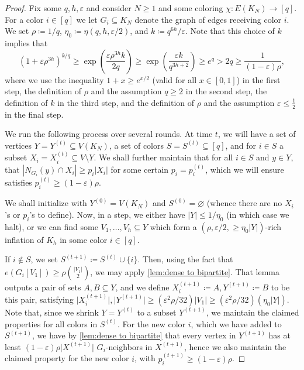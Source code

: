 \documentclass[11pt]{article}
\numberwithin{equation}{section}
\theoremstyle{plain}
\theoremstyle{remark}
\newcommand{\eps}{\ensuremath{\varepsilon}}
\let\emptyset\varnothing
\newcommand\ab[1]{\lvert #1 \rvert}
\newcommand\up[1]{^{(#1)}}
\begin{document}
\begin{proof}


Fix some $q,h,\eps$ and consider $N\ge 1$ and some coloring $\chi:E(K_N)\to [q]$. For a color $i\in [q]$ we let $G_i\subseteq K_N$ denote the graph of edges receiving color $i$. We set $\rho \coloneqq 1/q$, $\eta_0\coloneqq \eta(q,h,\eps/2)$, and $k\coloneqq q^{6h}/\eps$. Note that this choice of $k$ implies that
\begin{equation}\label{eq:k choice}
    (1+\eps \rho^{3h})^{k/q} \geq \exp \left( \frac{\eps \rho^{3h}k}{2q}\right) \geq \exp \left( \frac{\eps k}{q^{3h+2}}\right)\geq e^{q} > 2q \geq \frac{1}{(1-\eps)\rho},
\end{equation}
where we use the inequality $1+x \geq e^{x/2}$ (valid for all $x \in [0,1]$) in the first step, the definition of $\rho$ and the assumption $q \geq 2$ in the second step, the definition of $k$ in the third step, and the definition of $\rho$ and the assumption $\eps \leq \frac 12$ in the final step.

We run the following process over several rounds.
At time $t$, we will have a set of vertices $Y= Y^{(t)} \subseteq V(K_N)$, a set of colors $S= S^{(t)}\subseteq [q]$, and for $i\in S$ a subset $X_i= X^{(t)}_i\subseteq V\setminus Y$. We shall further maintain that for all $i\in S$ and $y\in Y$, that $|N_{G_i}(y)\cap X_i| \ge p_i|X_i|$ for some certain $p_i= p_i^{(t)}$, which we will ensure satisfies $p_i\up t\ge (1-\eps)\rho$. 


We shall initialize with $Y^{(0)} = V(K_N)$ and $S^{(0)} = \emptyset$ (whence there are no $X_i$'s or $p_i$'s to define). Now, in a step, we either have $|Y|\le 1/\eta_0$ (in which case we halt), or we can find some $V_1,\dots,V_{h}\subseteq Y$ which form a $(\rho,\eps/2,\ge \eta_0 |Y|)$-rich inflation of $K_h$ in some color $i\in [q]$. 

If $i \not \in S$, we set $S^{(t+1)} \coloneqq  S^{(t)}\cup \{i\}$. Then, using the fact that $e(G_i[V_1]) \geq \rho \binom{\ab{V_1}}2$, we may apply \cref{lem:dense to bipartite}. That lemma outputs a pair of sets $A,B \subseteq Y$, and we define $X_i \up{t+1}\coloneqq A, Y\up{t+1} \coloneqq B$ to be this pair, satisfying $\ab{X_i\up{t+1}}, \ab{Y\up{t+1}} \geq (\eps^2 \rho/32)\ab{V_1}\geq (\varepsilon^2\rho/32)(\eta_0\ab Y)$. Note that, since we shrink $Y= Y\up t$ to a subset $Y\up{t+1}$, we maintain the claimed properties for all colors in $S\up t$. For the new color $i$, which we have added to $S\up{t+1}$, we have by \cref{lem:dense to bipartite} that every vertex in $Y\up{t+1}$ has at least $(1-\eps)\rho \ab{X\up{t+1}}$ $G_i$-neighbors in $X\up{t+1}$, hence we also maintain the claimed property for the new color $i$, with $p_i\up {t+1} \geq (1-\eps)\rho$.




\end{proof}
\end{document}
